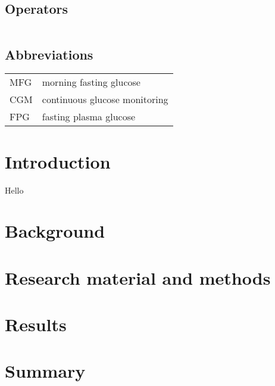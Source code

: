 \documentclass[english, 12pt, a4paper, elec, utf8, a-1b, online]{aaltothesis}
\begin{document}
\begin{tabular}{ll}

\end{tabular}

\subsection*{Operators}

\begin{tabular}{ll}

\end{tabular}

\subsection*{Abbreviations}

\begin{tabular}{ll}
MFG         & morning fasting glucose \\
CGM      & continuous glucose monitoring \\
FPG        & fasting plasma glucose \\ 
\end{tabular}

\cleardoublepage

\section{Introduction}
Hello \cite{moebus_impact_2011}
\thispagestyle{empty}

\clearpage

\section{Background}

\clearpage

\section{Research material and methods}

\clearpage

\section{Results}

\clearpage

\section{Summary} 

\clearpage




\clearpage

\thesisappendix
\end{document}
